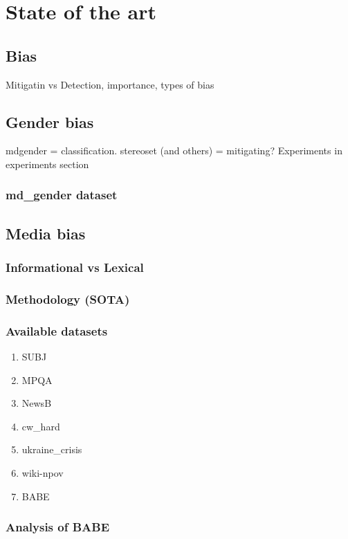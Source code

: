\chapter{State of the art}

\section{Bias}
Mitigatin vs Detection, importance, types of bias
\section{Gender bias}
mdgender = classification. stereoset (and others) = mitigating?
Experiments in experiments section
\subsection{md\_gender dataset}
\section{Media bias}
\subsection{Informational vs Lexical}
\subsection{Methodology (SOTA)}
\subsection{Available datasets}
\begin{enumerate}
    \item SUBJ
    \item MPQA
    \item NewsB
    \item cw\_hard
    \item ukraine\_crisis
    \item wiki-npov
    \item BABE
\end{enumerate}
\subsection{Analysis of BABE}